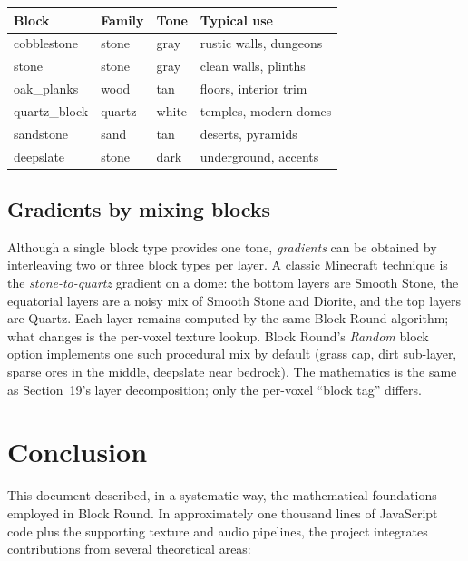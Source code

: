 \documentclass[12pt,a4paper]{scrartcl}
\begin{document}
\vspace{0.4em}
\begin{center}
\begin{tabular}{@{}llll@{}}
\toprule
\textbf{Block} & \textbf{Family} & \textbf{Tone} & \textbf{Typical use} \\
\midrule
cobblestone        & stone  & gray  & rustic walls, dungeons \\
stone              & stone  & gray  & clean walls, plinths \\
oak\_planks        & wood   & tan   & floors, interior trim \\
quartz\_block      & quartz    & white   & temples, modern domes \\
sandstone          & sand   & tan   & deserts, pyramids \\
deepslate          & stone  & dark  & underground, accents \\
\bottomrule
\end{tabular}
\end{center}

\subsection{Gradients by mixing blocks}
Although a single block type provides one tone, \emph{gradients} can be obtained by interleaving two or three block types per layer. A classic Minecraft technique is the \emph{stone-to-quartz} gradient on a dome: the bottom layers are Smooth Stone, the equatorial layers are a noisy mix of Smooth Stone and Diorite, and the top layers are Quartz. Each layer remains computed by the same Block Round algorithm; what changes is the per-voxel texture lookup. Block Round's \emph{Random} block option implements one such procedural mix by default (grass cap, dirt sub-layer, sparse ores in the middle, deepslate near bedrock). The mathematics is the same as Section~19's layer decomposition; only the per-voxel \enquote{block tag} differs.

\section{Conclusion}

This document described, in a systematic way, the mathematical foundations employed in Block Round. In approximately one thousand lines of JavaScript code plus the supporting texture and audio pipelines, the project integrates contributions from several theoretical areas:
\end{document}
